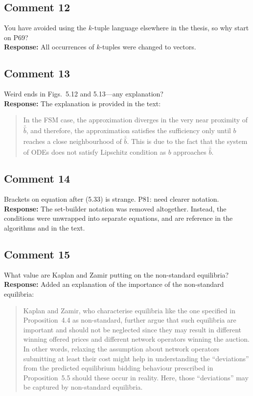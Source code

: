 \documentclass[10pt,a4paper,notitlepage]{article}
\numberwithin{equation}{section}
\begin{document}
\subsection{Comment 12}
You have avoided using the $k$-tuple language elsewhere in the thesis, so why start on P69?\\[-2ex]

\textbf{Response:}
All occurrences of $k$-tuples were changed to vectors.

\subsection{Comment 13}
Weird ends in Figs.~5.12 and 5.13---any explanation?\\[-2ex]

\textbf{Response:}
The explanation is provided in the text:
\begin{quote}
In the FSM case, the approximation diverges in the very near proximity of $\bar{\hat{b}}$, and therefore, the approximation satisfies the sufficiency only until $b$ reaches a close neighbourhood of $\bar{\hat{b}}$. This is due to the fact that the system of ODEs does not satisfy Lipschitz condition as $b$ approaches $\bar{\hat{b}}$.
\end{quote}

\subsection{Comment 14}
Brackets on equation after (5.33) is strange. P81: need clearer notation.\\[-2ex]

\textbf{Response:}
The set-builder notation was removed altogether. Instead, the conditions were unwrapped into separate equations, and are reference in the algorithms and in the text.

\subsection{Comment 15}
What value are Kaplan and Zamir putting on the non-standard equilibria?\\[-2ex]

\textbf{Response:}
Added an explanation of the importance of the non-standard equilibria:
\begin{quote}
Kaplan and Zamir, who characterise equilibria like the one specified in Proposition~4.4 as non-standard, further argue that such equilibria are important and should not be neglected since they may result in different winning offered prices and different network operators winning the auction. In other words, relaxing the assumption about network operators submitting at least their cost might help in understanding the ``deviations'' from the predicted equilibrium bidding behaviour prescribed in Proposition~5.5 should these occur in reality. Here, those ``deviations'' may be captured by non-standard equilibria.
\end{quote}
\end{document}
